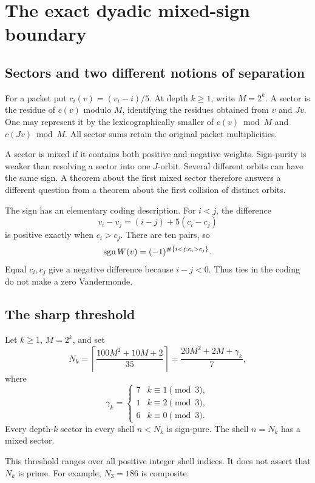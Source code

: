 \chapter{The exact dyadic mixed-sign boundary}\label{ch:tree}
\section{Sectors and two different notions of separation}
For a packet put $c_i(v)=(v_i-i)/5$. At depth $k\ge1$, write $M=2^k$. A sector is the residue of $c(v)$ modulo $M$, identifying the residues obtained from $v$ and $Jv$. One may represent it by the lexicographically smaller of $c(v)\bmod M$ and $c(Jv)\bmod M$. All sector sums retain the original packet multiplicities.

A sector is mixed if it contains both positive and negative weights. Sign-purity is weaker than resolving a sector into one $J$-orbit. Several different orbits can have the same sign. A theorem about the first mixed sector therefore answers a different question from a theorem about the first collision of distinct orbits.

The sign has an elementary coding description. For $i<j$, the difference
\[
v_i-v_j=(i-j)+5(c_i-c_j)
\]
is positive exactly when $c_i>c_j$. There are ten pairs, so
\begin{equation}\label{eq:inversionsign}
\operatorname{sgn} W(v)=(-1)^{\#\{i<j:c_i>c_j\}}.
\end{equation}
Equal $c_i,c_j$ give a negative difference because $i-j<0$. Thus ties in the coding do not make a zero Vandermonde.

\section{The sharp threshold}
\begin{theorem}\label{thm:threshold}
Let $k\ge1$, $M=2^k$, and set
\begin{equation}\label{eq:nk}
N_k=\left\lceil\frac{100M^2+10M+2}{35}\right\rceil
=\frac{20M^2+2M+\gamma_k}{7},
\end{equation}
where
\[
\gamma_k=\begin{cases}
7&k\equiv1\pmod3,\\
1&k\equiv2\pmod3,\\
6&k\equiv0\pmod3.
\end{cases}
\]
Every depth-$k$ sector in every shell $n<N_k$ is sign-pure. The shell $n=N_k$ has a mixed sector.
\end{theorem}
This threshold ranges over all positive integer shell indices. It does not assert that $N_k$ is prime. For example, $N_3=186$ is composite.

